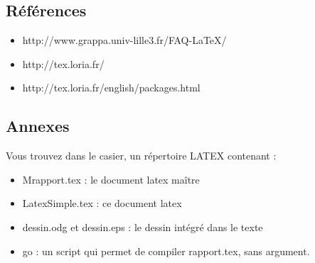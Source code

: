 \subsection{Références}
\begin{itemize}
\item http://www.grappa.univ-lille3.fr/FAQ-LaTeX/ 
\item http://tex.loria.fr/
\item http://tex.loria.fr/english/packages.html
\end{itemize}
\subsection{Annexes }
Vous trouvez dans le casier, un répertoire LATEX contenant :
\begin{itemize}
\item Mrapport.tex : le document latex maître
\item LatexSimple.tex : ce document latex
\item dessin.odg et dessin.eps : le dessin intégré dans le texte
\item go : un script qui permet de compiler rapport.tex, sans argument.
\end{itemize}
